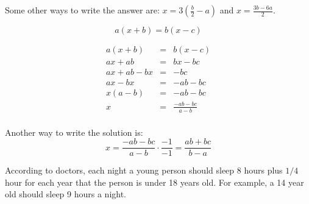 \documentclass[fleqn,addpoints]{exam}
\begin{document}
\begin{questions}
\begin{solution}[4 cm]
Some other ways to write the answer are: \( \displaystyle x = 3 \left(\frac{b}{2} - a \right) \) and 
\( \displaystyle x = \frac{3b - 6a}{2} \).

\end{solution}

\question[5]
\label{formula:last}
\[ a(x + b) = b(x - c) \]
\begin{solution}[4 cm]
\begin{eqnarray*}
  a(x + b) &=& b(x - c) \\
  ax + ab  &=& bx - bc  \\
  ax + ab - bx  &=& -bc  \\
  ax - bx  &=& -ab - bc  \\
  x(a - b)  &=& -ab - bc  \\
  x  &=& \frac{-ab - bc}{a - b}  \\
\end{eqnarray*}

Another way to write the solution is: 
\[ x = \frac{-ab - bc}{a - b} \cdot \frac{-1}{-1} = \frac{ab + bc}{b - a} \]

\end{solution}

\question

According to doctors, each night a young person should sleep 8 hours plus $1/4$ hour for each year that the person is
under 18 years old.  For example, a 14 year old should sleep 9 hours a night.

\end{questions}
\end{document}

